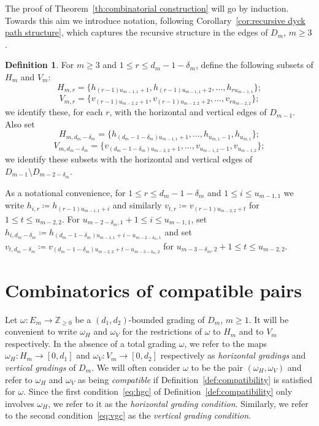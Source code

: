 \documentclass[10pt]{amsart}
\theoremstyle{definition}
\newtheorem{definition}[theorem]{Definition}
\newcommand{\ZZ}{\mathbb{Z}}
\begin{document}
The proof of Theorem~\ref{th:combinatorial construction} will go by induction. Towards this aim we introduce notation, following Corollary~\ref{cor:recursive dyck path structure}, which captures the recursive structure in the edges of $D_m$, $m\ge3$. 
\begin{definition}
 \label{def:subpath edges}
 For $m\ge3$ and $1\le r\le d_m-1-\delta_m$, define the following subsets of $H_m$ and $V_m$: 
 \[H_{m,r}=\{h_{(r-1)u_{m-1,1}+1},h_{(r-1)u_{m-1,1}+2},\ldots,h_{ru_{m-1,1}}\};\]
 \[V_{m,r}=\{v_{(r-1)u_{m-2,2}+1},v_{(r-1)u_{m-2,2}+2},\ldots,v_{ru_{m-2,2}}\};\]
 we identify these, for each $r$, with the horizontal and vertical edges of $D_{m-1}$. Also set 
 \[H_{m,d_m-\delta_m}=\{h_{(d_m-1-\delta_m)u_{m-1,1}+1},\ldots,h_{u_{m,1}-1},h_{u_{m,1}}\};\]
 \[V_{m,d_m-\delta_m}=\{v_{(d_m-1-\delta_m)u_{m-2,2}+1},\ldots,v_{u_{m-1,2}-1},v_{u_{m-1,2}}\};\]
 we identify these subsets with the horizontal and vertical edges of $D_{m-1}\setminus D_{m-2-\delta_m}$.

 As a notational convenience, for $1\le r\le d_m-1-\delta_m$ and $1\le i\le u_{m-1,1}$ we write $h_{i,r}\coloneqq h_{(r-1)u_{m-1,1}+i}$ and similarly $v_{t,r}\coloneqq v_{(r-1)u_{m-2,2}+t}$ for $1\le t\le u_{m-2,2}$. 
 For $u_{m-2-\delta_m,1}+1\le i\le u_{m-1,1}$, set $h_{i,d_m-\delta_m}\coloneqq h_{(d_m-1-\delta_m)u_{m-1,1}+i-u_{m-2-\delta_m,1}}$ and set $v_{t,d_m-\delta_m}\coloneqq v_{(d_m-1-\delta_m)u_{m-2,2}+t-u_{m-3-\delta_m,2}}$ for $u_{m-3-\delta_m,2}+1\le t\le u_{m-2,2}$.
\end{definition}


\section{Combinatorics of compatible pairs}
\label{sec:compatible pairs}

\noindent
Let $\omega:E_m\to\ZZ_{\ge0}$ be a $(d_1,d_2)$-bounded grading of $D_m$, $m\ge1$. 
It will be convenient to write $\omega_H$ and $\omega_V$ for the restrictions of $\omega$ to $H_m$ and to $V_m$ respectively. 
In the absence of a total grading $\omega$, we refer to the maps $\omega_H:H_m\to[0,d_1]$ and $\omega_V:V_m\to[0,d_2]$ respectively as \emph{horizontal gradings} and \emph{vertical gradings} of $D_m$. 
We will often consider $\omega$ to be the pair $(\omega_H,\omega_V)$ and refer to $\omega_H$ and $\omega_V$ as being \emph{compatible} if Definition~\ref{def:compatibility} is satisfied for $\omega$. 
Since the first condition~\eqref{eq:hgc} of Definition~\ref{def:compatibility} only involves $\omega_H$, we refer to it as the \emph{horizontal grading condition}. 
Similarly, we refer to the second condition~\eqref{eq:vgc} as the \emph{vertical grading condition}.
\end{document}
